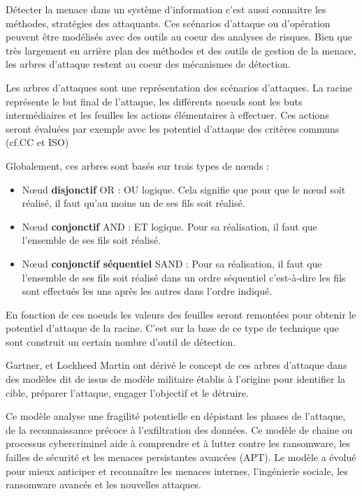 
Détecter la menace dans un système d'information c'est aussi connaitre les méthodes, stratégies des attaquants. Ces scénarios d'attaque ou d'opération peuvent être modélisés avec des outils au coeur des analyses de risques. Bien que très largement en arrière plan des méthodes et des outils de gestion de la menace, les arbres d'attaque restent au coeur des mécanismes de détection.

Les arbres d'attaques sont une représentation des scénarios d'attaques. La racine représente le but final de l'attaque, les différents noeuds sont les buts intermédiaires et les feuilles les actions élémentaires à effectuer. Ces actions seront évaluées par exemple avec les potentiel d'attaque des critères communs (cf.CC et ISO)

Globalement, ces arbres sont basés sur trois types de nœuds :

\begin{itemize}
  \item Nœud \textbf{disjonctif} OR : OU logique. Cela signifie que pour que le nœud soit réalisé, il faut qu’au moins un de ses fils soit réalisé.
  \item Nœud \textbf{conjonctif} AND : ET logique. Pour sa réalisation, il faut que l’ensemble de ses fils soit réalisé.
  \item Nœud \textbf{conjonctif séquentiel }SAND : Pour sa réalisation, il faut que l'ensemble de ses fils soit réalisé dans un ordre séquentiel c'est-à-dire les fils sont effectués les uns après les autres dans l’ordre indiqué.
\end{itemize}

En fonction de ces noeuds les valeurs des feuilles seront remontées pour obtenir le potentiel d'attaque de la racine.
C'est sur la base de ce type de technique que sont construit un certain nombre d'outil de détection.
 

Gartner, et Lockheed Martin ont dérivé le concept de ces arbres d'attaque dans des modèles dit de  issus de modèle militaire établis à l’origine pour identifier la cible, préparer l’attaque, engager l’objectif et le détruire.

Ce modèle analyse une fragilité potentielle en dépistant les phases de l’attaque, de la reconnaissance précoce à l’exfiltration des données. Ce modèle de chaine ou processus cybercriminel aide à comprendre et à lutter contre les ransomware, les failles de sécurité et les menaces persistantes avancées (APT). Le modèle a évolué pour mieux anticiper et reconnaître les menaces internes, l’ingénierie sociale, les ransomware avancés et les nouvelles attaques.

